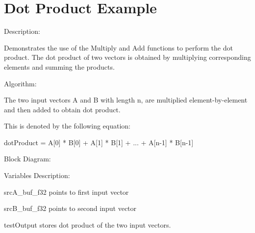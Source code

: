 \hypertarget{group___dotproduct_example}{\section{Dot Product Example}
\label{group___dotproduct_example}
}
\begin{DoxyParagraph}{Description\-: }

\end{DoxyParagraph}
\begin{DoxyParagraph}{}
Demonstrates the use of the Multiply and Add functions to perform the dot product. The dot product of two vectors is obtained by multiplying corresponding elements and summing the products.
\end{DoxyParagraph}
\begin{DoxyParagraph}{Algorithm\-:}

\end{DoxyParagraph}
\begin{DoxyParagraph}{}
The two input vectors {\ttfamily A} and {\ttfamily B} with length {\ttfamily n}, are multiplied element-\/by-\/element and then added to obtain dot product. 
\end{DoxyParagraph}
\begin{DoxyParagraph}{}
This is denoted by the following equation\-: 
\begin{DoxyPre}  dotProduct = A[0] * B[0] + A[1] * B[1] + ... + A[n-1] * B[n-1]\end{DoxyPre}

\end{DoxyParagraph}
\begin{DoxyParagraph}{Block Diagram\-:}

\end{DoxyParagraph}
\begin{DoxyParagraph}{}

\end{DoxyParagraph}
\begin{DoxyParagraph}{Variables Description\-:}

\end{DoxyParagraph}
\begin{DoxyParagraph}{}
\begin{DoxyItemize}
\item {\ttfamily src\-A\-\_\-buf\-\_\-f32} points to first input vector \item {\ttfamily src\-B\-\_\-buf\-\_\-f32} points to second input vector \item {\ttfamily test\-Output} stores dot product of the two input vectors.\end{DoxyItemize}

\end{DoxyParagraph}
